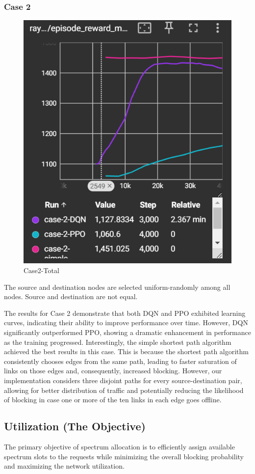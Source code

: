\documentclass[conference]{IEEEtran}
\begin{document}
\subsubsection{Case 2}
\begin{figure}[h]
    \centering
    \includegraphics[width=0.75\linewidth]{all2.png}
    \caption{Case2-Total}
    \label{fig:enter-label}
\end{figure}

The source and destination nodes are selected uniform-randomly among all nodes. Source and destination are not equal.

The results for Case 2 demonstrate that both DQN and PPO exhibited learning curves, indicating their ability to improve performance over time. However, DQN significantly outperformed PPO, showing a dramatic enhancement in performance as the training progressed. Interestingly, the simple shortest path algorithm achieved the best results in this case. This is because the shortest path algorithm consistently chooses edges from the same path, leading to faster saturation of links on those edges and, consequently, increased blocking. However, our implementation considers three disjoint paths for every source-destination pair, allowing for better distribution of traffic and potentially reducing the likelihood of blocking in case one or more of the ten links in each edge goes offline.
\subsection{Utilization (The Objective)}
 The primary objective of spectrum allocation is to efficiently assign available spectrum slots to the requests while minimizing the overall blocking probability and maximizing the network utilization.
\end{document}
